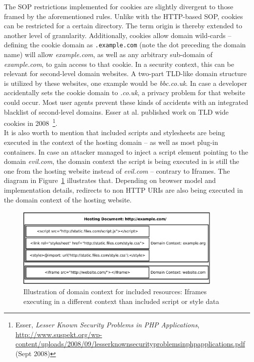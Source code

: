 	The SOP restrictions implemented for cookies are slightly divergent to those framed by the aforementioned rules. Unlike with the HTTP-based SOP, cookies can be restricted for a certain directory. The term origin is thereby extended to another level of granularity. Additionally, cookies allow domain wild-cards -- defining the cookie domain as \texttt{.example.com} (note the dot preceding the domain name) will allow \textit{example.com}, as well as any arbitrary sub-domain of \textit{example.com}, to gain access to that cookie. In a security context, this can be relevant for second-level domain websites. A two-part TLD-like domain structure is utilized by these websites, one example would be \textit{bbc.co.uk}. In case a developer accidentally sets the cookie domain to \textit{.co.uk}, a privacy problem for that website could occur. Most user agents prevent these kinds of accidents with an integrated blacklist of second-level domains. Esser at al. published work on TLD wide cookies in 2008~\footnote{Esser, \textit{Lesser Known Security Problems in PHP Applications}, \url{http://www.suspekt.org/wp-content/uploads/2008/09/lesserknownsecurityproblemsinphpapplications.pdf} (Sept 2008)}. \\

	It is also worth to mention that included scripts and stylesheets are being executed in the context of the hosting domain -- as well as most plug-in containers. In case an attacker managed to inject a script element pointing to the domain \textit{evil.com}, the domain context the script is being executed in is still the one from the hosting website instead of \textit{evil.com} -- contrary to Iframes. The diagram in Figure~\ref{fig:sop} illustrates that. Depending on browser model and implementation details, redirects to non HTTP URIs are also being executed in the domain context of the hosting website.\\

\begin{figure}[htb]
\centering
\includegraphics[width=0.9\textwidth]{./img/sop.pdf}
\caption{Illustration of domain context for included resources: Iframes executing in a different context than included script or style data}
\label{fig:sop}
\end{figure}


